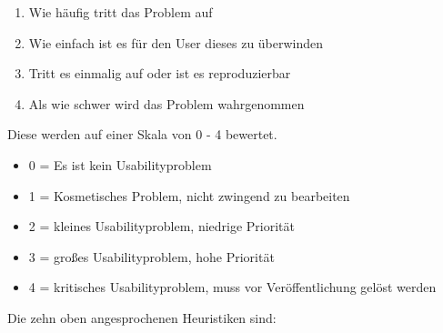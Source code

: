 \documentclass[draft=false
              ,paper=a4
              ,twoside=false
              ,fontsize=11pt
              ,headsepline
              ,BCOR10mm
              ,DIV11
              ]{scrbook}
\begin{document}
\begin{enumerate}
  \item Wie häufig tritt das Problem auf
  \item Wie einfach ist es für den User dieses zu überwinden
  \item Tritt es einmalig auf oder ist es reproduzierbar
  \item Als wie schwer wird das Problem wahrgenommen
\end{enumerate}

Diese werden auf einer Skala von 0 - 4 bewertet. 

\begin{itemize}
  \item[] 0 = Es ist kein Usabilityproblem
  \item[] 1 = Kosmetisches Problem, nicht zwingend zu bearbeiten
  \item[] 2 = kleines Usabilityproblem, niedrige Priorität
  \item[] 3 = großes Usabilityproblem, hohe Priorität
  \item[] 4 = kritisches Usabilityproblem, muss vor Veröffentlichung gelöst werden 
\end{itemize}

Die zehn oben angesprochenen Heuristiken sind:
\end{document}
